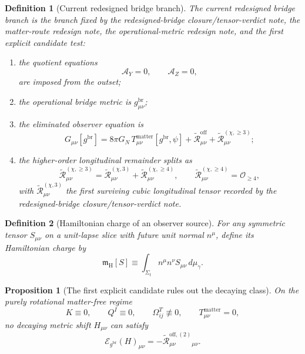 \documentclass[11pt]{article}
\newcommand{\ReBridge}{g^{\mathrm{br}}}
\newcommand{\ReOff}{\widetilde{\mathcal R}_{\mu\nu}^{\mathrm{off}}}
\newcommand{\ReOffTwo}{\widetilde{\mathcal R}_{\mu\nu}^{\mathrm{off},(2)}}
\newcommand{\ReLong}{\widetilde{\mathcal R}_{\mu\nu}^{(\chi,\ge 3)}}
\newcommand{\ReLongThree}{\widetilde{\mathcal R}_{\mu\nu}^{(\chi,3)}}
\newcommand{\ReLongFour}{\widetilde{\mathcal R}_{\mu\nu}^{(\chi,\ge 4)}}
\newcommand{\EinLin}{\mathcal E_{\ReBridge}}
\newcommand{\HamCharge}{\mathfrak m_{\mathrm H}}
\newcommand{\AY}{\mathcal A_Y}
\newcommand{\AZ}{\mathcal A_Z}
\newtheorem{definition}{Definition}
\newtheorem{proposition}{Proposition}
\begin{document}
\begin{definition}[Current redesigned bridge branch]
\label{def:branch}
The \emph{current redesigned bridge branch} is the branch fixed by the redesigned-bridge closure/tensor-verdict note, the matter-route redesign note, the operational-metric redesign note, and the first explicit candidate test:
\begin{enumerate}
    \item the quotient equations
    \begin{equation}
    \AY=0,
    \qquad
    \AZ=0,
    \label{eq:AYAZ}
    \end{equation}
    are imposed from the outset;
    \item the operational bridge metric is \(\ReBridge_{\mu\nu}\);
    \item the eliminated observer equation is
    \begin{equation}
    G_{\mu\nu}[\ReBridge]
    =
    8\pi G_N\,T_{\mu\nu}^{\mathrm{matter}}[\ReBridge,\psi]
    +\ReOff+\ReLong;
    \label{eq:oldobs}
    \end{equation}
    \item the higher-order longitudinal remainder splits as
    \begin{equation}
    \ReLong=\ReLongThree+\ReLongFour,
    \qquad
    \ReLongFour=\mathcal O_{\ge 4},
    \label{eq:longsplit}
    \end{equation}
    with \(\ReLongThree\) the first surviving cubic longitudinal tensor recorded by the redesigned-bridge closure/tensor-verdict note.
\end{enumerate}
\end{definition}

\begin{definition}[Hamiltonian charge of an observer source]
\label{def:charge}
For any symmetric tensor \(S_{\mu\nu}\) on a unit-lapse slice with future unit normal \(n^\mu\), define its \emph{Hamiltonian charge} by
\begin{equation}
\HamCharge[S]
\equiv
\int_{\Sigma_t} n^\mu n^\nu S_{\mu\nu}\,d\mu_\gamma.
\label{eq:charge}
\end{equation}
\end{definition}

\begin{proposition}[The first explicit candidate rules out the decaying class]
\label{prop:decay}
On the purely rotational matter-free regime
\begin{equation}
K\equiv0,
\qquad
Q^I\equiv0,
\qquad
\Omega_{ij}^T\not\equiv0,
\qquad
T_{\mu\nu}^{\mathrm{matter}}=0,
\label{eq:rot}
\end{equation}
no decaying metric shift \(H_{\mu\nu}\) can satisfy
\begin{equation}
\EinLin(H)_{\mu\nu}=-\ReOffTwo{}_{\mu\nu}.
\label{eq:nosolve}
\end{equation}
\end{proposition}
\end{document}
